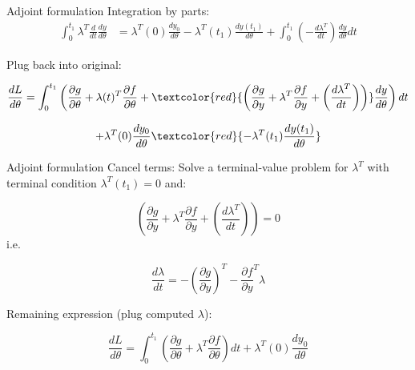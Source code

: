 \documentclass{beamer}
\begin{document}
\begin{frame}{Adjoint formulation}
    Integration by parts:
    $$\begin{aligned}\int_{0}^{t_1} \lambda^T \frac{d}{dt}\frac{dy}{d\theta} &= \lambda^T(0) \frac{dy_0}{d\theta} - \lambda^T (t_1)\frac{dy(t_1)}{d\theta} + \int_{0}^{t_1}\left( -\frac{d\lambda^T}{dt}\right)\frac{dy}{d\theta}dt\end{aligned}$$

    Plug back into original:

    $$\frac{dL}{d\theta} = \int_{0}^{t_1} \left(\frac{\partial g}{\partial \theta} + \lambda(t)^T \frac{\partial f}{\partial \theta} + \textcolor{red}{\left( \frac{\partial g}{\partial y} + \lambda^T \frac{\partial f}{\partial y} + \left(\frac{d\lambda^T}{dt}\right)\right)} \frac{dy}{d\theta}\right)dt$$
    
    $$+ \lambda^T(0) \frac{dy_0}{d\theta} \textcolor{red}{- \lambda^T (t_1)\frac{dy(t_1)}{d\theta}}$$
\end{frame}

\begin{frame}{Adjoint formulation}
Cancel terms: Solve a terminal-value problem for $\lambda^T$ with terminal condition $\lambda^T(t_1)=0$ and:

$$\left( \frac{\partial g}{\partial y} + \lambda^T \frac{\partial f}{\partial y} + \left(\frac{d\lambda^T}{dt}\right)\right) = 0$$ i.e.

$$\frac{d\lambda}{dt} = -\left(\frac{\partial g}{\partial y}\right)^T - \frac{\partial f}{\partial y}^T \lambda$$

Remaining expression (plug computed $\lambda$):

$$\frac{dL}{d\theta} = \int_{0}^{t_1} \left(\frac{\partial g}{\partial \theta} + \lambda^T \frac{\partial f}{\partial \theta}\right)dt + \lambda^T(0) \frac{dy_0}{d\theta}$$ 
\end{frame}
\end{document}
